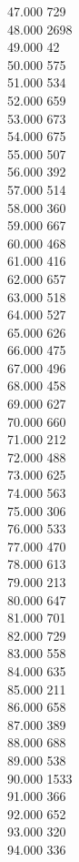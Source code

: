 { 47.000	729 \\
 48.000	2698 \\
 49.000	42 \\
 50.000	575 \\
 51.000	534 \\
 52.000	659 \\
 53.000	673 \\
 54.000	675 \\
 55.000	507 \\
 56.000	392 \\
 57.000	514 \\
 58.000	360 \\
 59.000	667 \\
 60.000	468 \\
 61.000	416 \\
 62.000	657 \\
 63.000	518 \\
 64.000	527 \\
 65.000	626 \\
 66.000	475 \\
 67.000	496 \\
 68.000	458 \\
 69.000	627 \\
 70.000	660 \\
 71.000	212 \\
 72.000	488 \\
 73.000	625 \\
 74.000	563 \\
 75.000	306 \\
 76.000	533 \\
 77.000	470 \\
 78.000	613 \\
 79.000	213 \\
 80.000	647 \\
 81.000	701 \\
 82.000	729 \\
 83.000	558 \\
 84.000	635 \\
 85.000	211 \\
 86.000	658 \\
 87.000	389 \\
 88.000	688 \\
 89.000	538 \\
 90.000	1533 \\
 91.000	366 \\
 92.000	652 \\
 93.000	320 \\
 94.000	336 \\
}
